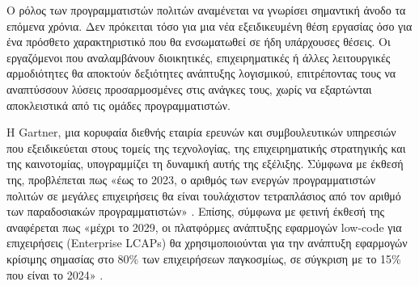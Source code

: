                 \begin{table}[H] \noindent\centering
                \end{table}

                Ο ρόλος των προγραμματιστών πολιτών αναμένεται να γνωρίσει σημαντική άνοδο τα επόμενα χρόνια. Δεν πρόκειται τόσο για μια νέα εξειδικευμένη θέση εργασίας όσο για ένα πρόσθετο χαρακτηριστικό που θα ενσωματωθεί σε ήδη υπάρχουσες θέσεις. Οι εργαζόμενοι που αναλαμβάνουν διοικητικές, επιχειρηματικές ή άλλες λειτουργικές αρμοδιότητες θα αποκτούν δεξιότητες ανάπτυξης λογισμικού, επιτρέποντας τους να αναπτύσσουν λύσεις προσαρμοσμένες στις ανάγκες τους, χωρίς να εξαρτώνται αποκλειστικά από τις ομάδες προγραμματιστών.

                Η Gartner, μια κορυφαία διεθνής εταιρία ερευνών και συμβουλευτικών υπηρεσιών που εξειδικεύεται στους τομείς της τεχνολογίας, της επιχειρηματικής στρατηγικής και της καινοτομίας, υπογραμμίζει τη δυναμική αυτής της εξέλιξης. Σύμφωνα με έκθεσή της, προβλέπεται πως «έως το 2023, ο αριθμός των ενεργών προγραμματιστών πολιτών σε μεγάλες επιχειρήσεις θα είναι τουλάχιστον τετραπλάσιος από τον αριθμό των παραδοσιακών προγραμματιστών» \cite{GartnerReport}. Επίσης, σύμφωνα με φετινή έκθεσή της αναφέρεται πως «μέχρι το 2029, οι πλατφόρμες ανάπτυξης εφαρμογών low-code για επιχειρήσεις (Enterprise LCAPs) θα χρησιμοποιούνται για την ανάπτυξη εφαρμογών κρίσιμης σημασίας στο 80\% των επιχειρήσεων παγκοσμίως, σε σύγκριση με το 15\% που είναι το 2024» \cite{mendixGartnerQuadrant}.

